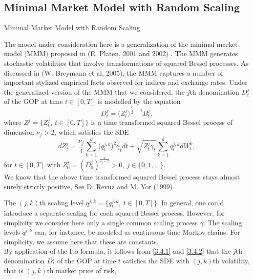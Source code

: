 \documentclass[unknownkeysallowed, compress]{beamer}
\theoremstyle{plain}
\begin{document}
\subsection{Minimal Market Model with Random Scaling}
\begin{frame}[allowframebreaks]{Minimal Market Model with Random Scaling}
\noindent
\par The model under consideration here is a generalization of the minimal market model (MMM) proposed in %
(E. Platen, 2001 and 2002) . The MMM generates
stochastic volatilities that involve transformations of squared Bessel processes.
As discussed in (W. Breymann et al, 2005), the MMM captures a number of
important stylized empirical facts observed for indices and exchange rates.
Under the generalized version of the MMM that we considered, the $j$th denomination $D_t^j$ of the GOP at time $t \in [0, T ]$ is modelled by the equation
\begin{equation}\label{3.4.1}
D_t^j = \bigg(Z_t^j\bigg)^{\frac{\nu_j}{2}-1}B_t^j,
\end{equation}
where $Z^j = \{Z_t^j,~t\in[0,T]\}$ is a time transformed squared Bessel process of dimension $\nu_j>2$, which satisfies the SDE
\begin{equation}\label{3.4.2}
dZ_t^j = \frac{\nu_j}{4}\sum_{k = 1}^d\bigg(q_t^{j,k}\bigg)^2\gamma_tdt+\sqrt{Z_t^j\gamma_t}\sum_{k = 1}^dq_t^{j,k}dW_t^k,
\end{equation}
for $t\in[0,T]$ with $Z_0^j = (D_0^j)^{\frac{2}{\nu_j-2}}>0,~j\in\{0,1,\ldots\}$.\\
We know that the above time transformed squared Bessel process stays almost
surely strictly positive, See D. Revuz and M. Yor (1999).\\
\par The $(j,k)$th scaling level $q^{j,k} = \{q_t^{j,k},~t\in[0,T]\}$. In general, one could introduce a separate scaling for each squared Bessel process. However, for simplicity we consider  here only a single common scaling process $\gamma$. The scaling levels $q^{j,k}$ can, for instance, be modeled as continuous time Markov chains. For simplicity, we assume here that these are constants. \\

By application of the Ito formula, it follows from \eqref{3.4.1} and \eqref{3.4.2} that the $j$th
denomination $D^j_t$ of the GOP at time $t$ satisfies the SDE %
 with $(j, k)$th
volatility, that is $(j,k)$th market price of risk,


\end{frame}
\end{document}
